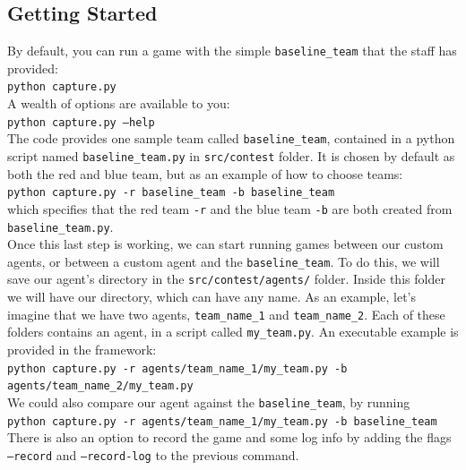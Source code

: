 \documentclass[11pt]{article}
\begin{document}
\subsection{Getting Started}
By default, you can run a game with the simple \texttt{baseline\_team} that the staff has provided:
\\

\texttt{python capture.py}
\\

A wealth of options are available to you:
\\

\texttt{python capture.py --help}
\\

The code provides one sample team called \texttt{baseline\_team}, contained in a python script named \texttt{baseline\_team.py} in \texttt{src/contest} folder. It is chosen by default as both the red and blue team, but as an example of how to choose teams:
\\

\texttt{python capture.py -r baseline\_team -b baseline\_team}
\\

which specifies that the red team \texttt{-r} and the blue team \texttt{-b} are both created from \texttt{baseline\_team.py}. \\

Once this last step is working, we can start running games between our custom agents, or between a custom agent and the \texttt{baseline\_team}. To do this, we will save our agent's directory in the \texttt{src/contest/agents/} folder. Inside this folder we will have our directory, which can have any name. As an example, let's imagine that we have two agents, \texttt{team\_name\_1} and \texttt{team\_name\_2}. Each of these folders contains an agent, in a script called \texttt{my\_team.py}.
An executable example is provided in the framework: 
\\

\texttt{python capture.py -r agents/team\_name\_1/my\_team.py -b agents/team\_name\_2/my\_team.py}
\\

We could also compare our agent against the \texttt{baseline\_team}, by running
\\

\texttt{python capture.py -r agents/team\_name\_1/my\_team.py -b baseline\_team}
\\

There is also an option to record the game and some log info by adding the flags \texttt{--record} and \texttt{--record-log} to the previous command. 
\end{document}
